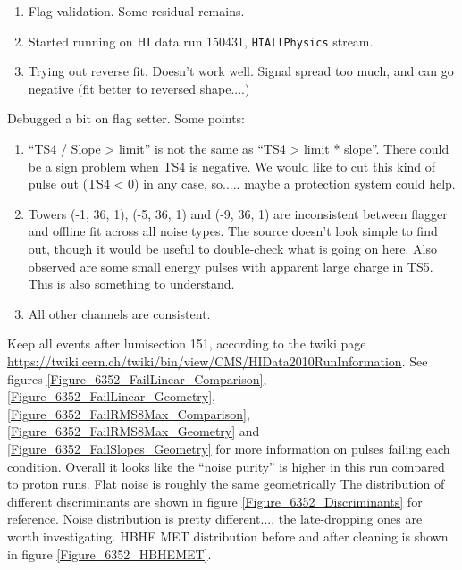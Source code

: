 

\begin{enumerate}
\item Flag validation.  Some residual remains.
\item Started running on HI data run 150431, \texttt{HIAllPhysics} stream.
\item Trying out reverse fit.  Doesn't work well.  Signal spread too much, and can go negative (fit better to reversed shape....)
\end{enumerate}


Debugged a bit on flag setter.  Some points:

\begin{enumerate}
\item ``TS4 / Slope > limit'' is not the same as ``TS4 > limit * slope''.  There could be a sign problem when TS4 is negative.
We would like to cut this kind of pulse out (TS4 < 0) in any case, so..... maybe a protection system could help.
\item Towers (-1, 36, 1), (-5, 36, 1) and (-9, 36, 1) are inconsistent between flagger and offline fit across all noise types.
The source doesn't look simple to find out, though it would be useful to double-check what is going on here.
Also observed are some small energy pulses with apparent large charge in TS5.  This is also something to understand.
\item All other channels are consistent.
\end{enumerate}


Keep all events after lumisection 151, according to the twiki page \url{https://twiki.cern.ch/twiki/bin/view/CMS/HIData2010RunInformation}.
See figures \ref{Figure_6352_FailLinear_Comparison}, \ref{Figure_6352_FailLinear_Geometry}, \ref{Figure_6352_FailRMS8Max_Comparison},
\ref{Figure_6352_FailRMS8Max_Geometry} and \ref{Figure_6352_FailSlopes_Geometry} for more information on pulses failing each condition.
Overall it looks like the ``noise purity'' is higher in this run compared to proton runs.  Flat noise is roughly the same geometrically
The distribution of different discriminants are shown in figure \ref{Figure_6352_Discriminants} for reference.
Noise distribution is pretty different.... the late-dropping ones are worth investigating.
HBHE MET distribution before and after cleaning is shown in figure \ref{Figure_6352_HBHEMET}.

